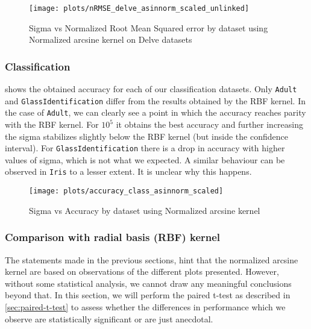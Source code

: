 
\begin{figure}[H]
    \texttt{[image: plots/nRMSE\_delve\_asinnorm\_scaled\_unlinked]}
    \caption{Sigma vs Normalized Root Mean Squared error by dataset using Normalized arcsine kernel on
        Delve datasets}%
    \label{fig:nrmse-delve-asinnorm-scaled}
\end{figure}

\subsubsection{Classification}

 shows the obtained accuracy for each
of our classification datasets. Only \texttt{Adult} and \texttt{GlassIdentification}
differ from the results obtained by the RBF kernel. In the case of \texttt{Adult},
we can clearly see a point in which the accuracy reaches parity with the RBF
kernel. For $10^5$ it obtains the best accuracy and further increasing the sigma
stabilizes slightly below the RBF kernel (but inside the confidence interval). For
\texttt{GlassIdentification} there is a drop in accuracy with higher values of
sigma, which is not what we expected. A similar behaviour can be observed in
\texttt{Iris} to a lesser extent. It is unclear why this happens.


\begin{figure}[H]
    \texttt{[image: plots/accuracy\_class\_asinnorm\_scaled]}
    \caption{Sigma vs Accuracy by dataset using Normalized arcsine kernel}%
    \label{fig:accuracy-asinnorm-scaled}
\end{figure}

\subsubsection{Comparison with radial basis (RBF) kernel}%
\label{ssub:comparison_with_radial_basis_rbf_kernel}

The statements made in the previous sections, hint that the normalized arcsine
kernel are based on observations of the different plots presented. However,
without some statistical analysis, we cannot draw any meaningful conclusions
beyond that. In this section, we will perform the paired t-test as described in
\cref{sec:paired-t-test} to assess whether the differences in performance which
we observe are statistically significant or are just anecdotal.


